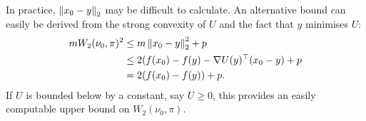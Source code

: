 \begin{note}
    In practice, $\norm{x_0-y}_2$ may be difficult to calculate.  An alternative bound can easily be derived from the strong convexity of $U$ and the fact that $y$ minimises $U$:
    \begin{align*}
        m W_2(\nu_0, \pi)^2 &\leq m \norm{x_0-y}_2^2 + p\\
        &\leq 2(f(x_0) - f(y) - \nabla U(y)^{\top}(x_0-y) + p\\
        &= 2(f(x_0)-f(y))+p.
    \end{align*}
    If $U$ is bounded below by a constant, say $U \geq 0$, this provides an easily computable upper bound on $W_2(\nu_0, \pi)$.
\end{note}

